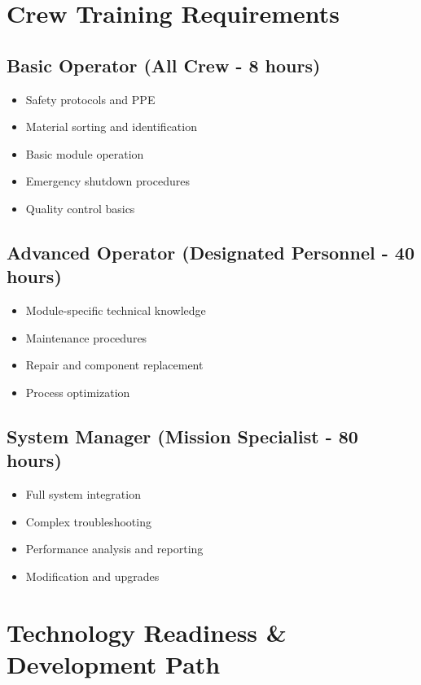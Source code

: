 \documentclass[12pt, a4paper]{article}
\begin{document}
\section{Crew Training Requirements}

\subsection{Basic Operator (All Crew - 8 hours)}
\begin{itemize}
    \item Safety protocols and PPE
    \item Material sorting and identification
    \item Basic module operation
    \item Emergency shutdown procedures
    \item Quality control basics
\end{itemize}

\subsection{Advanced Operator (Designated Personnel - 40 hours)}
\begin{itemize}
    \item Module-specific technical knowledge
    \item Maintenance procedures
    \item Repair and component replacement
    \item Process optimization
\end{itemize}

\subsection{System Manager (Mission Specialist - 80 hours)}
\begin{itemize}
    \item Full system integration
    \item Complex troubleshooting
    \item Performance analysis and reporting
    \item Modification and upgrades
\end{itemize}

\section{Technology Readiness \& Development Path}
\end{document}
